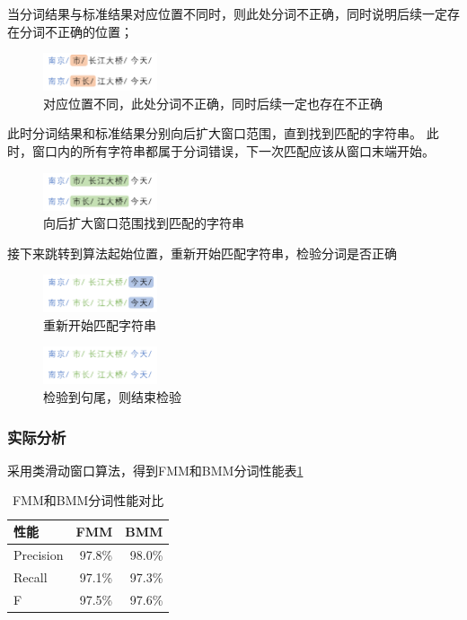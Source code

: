当分词结果与标准结果对应位置不同时，则此处分词不正确，同时说明后续一定存在分词不正确的位置；

\begin{figure}[H]
  \centering
  \includegraphics[width=0.3\textwidth]{figures/figure_03.png}
  \caption{对应位置不同，此处分词不正确，同时后续一定也存在不正确}
\end{figure}

此时分词结果和标准结果分别向后扩大窗口范围，直到找到匹配的字符串。
此时，窗口内的所有字符串都属于分词错误，下一次匹配应该从窗口末端开始。

\begin{figure}[H]
  \centering
  \includegraphics[width=0.3\textwidth]{figures/figure_04.png}
  \caption{向后扩大窗口范围找到匹配的字符串}
\end{figure}

接下来跳转到算法起始位置，重新开始匹配字符串，检验分词是否正确

\begin{figure}[H]
  \centering
  \includegraphics[width=0.3\textwidth]{figures/figure_05.png}
  \caption{重新开始匹配字符串}
\end{figure}
\begin{figure}[H]
  \centering
  \includegraphics[width=0.3\textwidth]{figures/figure_06.png}
  \caption{检验到句尾，则结束检验}
\end{figure}

\subsubsection{实际分析}

采用类滑动窗口算法，得到FMM和BMM分词性能表\ref{seg_evaluate}

\begin{table}[H]
  \centering
  \begin{tabular}{lrr}
    \hline
    \textbf{性能} & \textbf{FMM} & \textbf{BMM} \\
    \hline
    Precision     & 97.8\%       & 98.0\%       \\
    Recall        & 97.1\%       & 97.3\%       \\
    F             & 97.5\%       & 97.6\%       \\
    \hline
  \end{tabular}
  \caption{FMM和BMM分词性能对比}
  \label{seg_evaluate}
\end{table}

